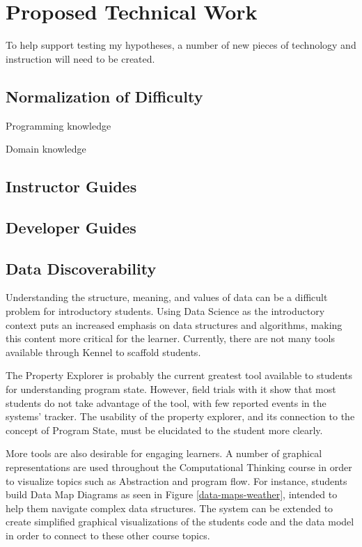 \section{Proposed Technical Work}

To help support testing my hypotheses, a number of new pieces of technology and instruction will need to be created.

\subsection{Normalization of Difficulty}

Programming knowledge

Domain knowledge

\subsection{Instructor Guides}

\subsection{Developer Guides}

\subsection{Data Discoverability}

Understanding the structure, meaning, and values of data can be a difficult problem for introductory students.
Using Data Science as the introductory context puts an increased emphasis on data structures and algorithms, making this content more critical for the learner.
Currently, there are not many tools available through Kennel to scaffold students.

The Property Explorer is probably the current greatest tool available to students for understanding program state.
However, field trials with it show that most students do not take advantage of the tool, with few reported events in the systems' tracker.
The usability of the property explorer, and its connection to the concept of Program State, must be elucidated to the student more clearly.

More tools are also desirable for engaging learners.
A number of graphical representations are used throughout the Computational Thinking course in order to visualize topics such as Abstraction and program flow.
For instance, students build Data Map Diagrams as seen in Figure \ref{data-maps-weather}, intended to help them navigate complex data structures.
The system can be extended to create simplified graphical visualizations of the students code and the data model in order to connect to these other course topics.

